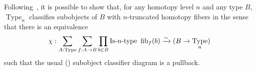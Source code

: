 \documentclass[preprint,9pt,numbers]{sigplanconf}
\newtheorem{prop}[thm]{Proposition}
\newtheorem{defi}[thm]{Definition}
\newcommand \defeq {\overset{de\hspace{-0.2ex}f}{=}}
\newcommand{\mynote}[2]{
    \fbox{\bfseries\sffamily\scriptsize#1}
    {\small$\blacktriangleright$\textsf{\emph{#2}}$\blacktriangleleft$}~}
\newcommand\kq[1]{\mynote{KQ}{#1}}
\newcommand{\ie}{i.e,\xspace}
\DeclareMathOperator{\Type}{Type}
\DeclareMathOperator{\im}{Im}
\def\mymathhyphen{{\hbox{-}}}
\newcommand{\IsType}[1]
{\mathop{\mathrm{Is\mymathhyphen}#1\mathrm{\mymathhyphen type}} }
\newcommand \fib[2] {\mathrm{fib}_{#1}(#2)}
\newenvironment{mymath}[1][-0em]{%
  \newcommand\mymathaux{\vspace{#1}}%
  \vspace{#1}%
  \begin{equation*}%
  }{ %
    \mymathaux%
  \end{equation*}}
\begin{document}
Following~\cite{sets_in_hott}, it is possible to show that, for any
homotopy level $n$ and any type $B$, $\Type_n$ classifies subobjects
of $B$ with $n$-truncated homotopy fibers in the sense that there is
an equivalence
%
\begin{mymath}[0em]
  \chi : \sum_{A:\Type} \sum_{f:A \to B} \prod_{b\in B}
\IsType n\
\fib{f}{b} \xrightarrow{\sim} 
 (B \to \Type_n)
\end{mymath}%
%
 such that the usual (\cite[Theorem 4.8.4]{hottbook}) subobject classifier diagram is a pullback.





\end{document}
